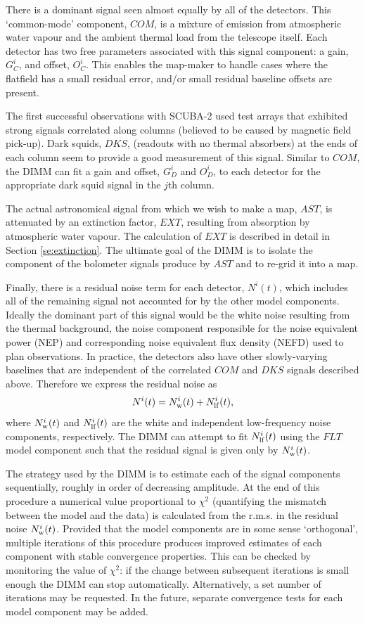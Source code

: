 \documentclass[twoside,11pt]{article}
\renewcommand{\_}{\texttt{\symbol{95}}}
\begin{document}
There is a dominant signal seen almost equally by all of the
detectors. This `common-mode' component, $COM$, is a mixture of
emission from atmospheric water vapour and the ambient thermal load
from the telescope itself. Each detector has two free parameters
associated with this signal component: a gain, $G_C^i$, and offset,
$O_C^i$. This enables the map-maker to handle cases where the
flatfield has a small residual error, and/or small residual baseline
offsets are present.

The first successful observations with SCUBA-2 used test arrays that
exhibited strong signals correlated along columns (believed to be
caused by magnetic field pick-up). Dark squids, $DKS$, (readouts with
no thermal absorbers) at the ends of
each
column seem to provide
a good measurement of this signal. Similar to $COM$, the DIMM can fit
a gain and offset, $G_D^i$ and $O_D^i$, to each detector for the
appropriate dark squid signal in the $j$th column.

The actual astronomical signal from which we wish to make a map,
$AST$, is attenuated by an extinction factor, $EXT$, resulting from
absorption by atmospheric water vapour. The calculation of $EXT$ is
described in detail in Section \ref{se:extinction}. The ultimate goal
of the DIMM is to isolate the component of the bolometer signals
produce by $AST$ and to re-grid it into a map.

Finally, there is a residual noise term for each detector, $N^i(t)$,
which includes all of the remaining signal not accounted for by the
other model components. Ideally the dominant part of this signal would
be the white noise resulting from the thermal background, the noise
component responsible for the noise equivalent power (NEP) and
corresponding noise equivalent flux density (NEFD) used to plan
observations. In practice, the detectors also have other
slowly-varying baselines that are independent of the correlated $COM$
and $DKS$ signals described above. Therefore we express the residual
noise as
%
\begin{equation}
N^i(t) = N^i_{\rm w}(t) + N^i_{\rm lf}(t),
\label{eq:dimm_noise}
\end{equation}
%
where $N^i_{\rm w}(t)$ and $N^i_{\rm lf}(t)$ are the white and
independent low-frequency noise components, respectively. The DIMM can
attempt to fit $N^i_{\rm lf}(t)$ using the $FLT$ model component such
that the residual signal is given only by $N^i_{\rm w}(t)$.

The strategy used by the DIMM is to estimate each of the signal
components sequentially, roughly in order of decreasing amplitude. At
the end of this procedure a numerical value proportional to $\chi^2$
(quantifying the mismatch between the model and the data) is
calculated from the r.m.s. in the residual noise $N^i_{\rm
  w}(t)$. Provided that the model components are in some sense
`orthogonal', multiple iterations of this procedure produces improved
estimates of each component with stable convergence properties. This
can be checked by monitoring the value of $\chi^2$: if the change
between subsequent iterations is small enough the DIMM can stop
automatically. Alternatively, a set number of iterations may be
requested. In the future, separate convergence tests for each model
component may be added.
\end{document}
